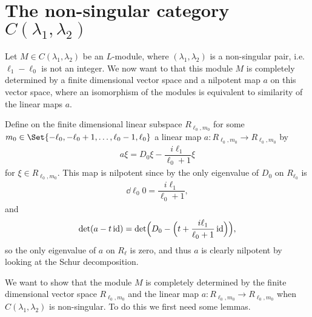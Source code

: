 \section{\texorpdfstring{The non-singular category $C(\lambda_1,\lambda_2)$}{The non-singular category C(lambda\_1,lambda\_2)}}

Let $M\in C(\lambda_1,\lambda_2)$ be an $L$-module, where $(\lambda_1,\lambda_2)$ is a non-singular pair, i.e.\ $\ell_1-\ell_0$ is not an integer. We now want to that this module $M$ is completely determined by a finite dimensional vector space and a nilpotent map $a$ on this vector space, where an isomorphism of the modules is equivalent to similarity of the linear maps $a$.

Define on the finite dimensional linear subspace $R_{\ell_0,m_0}$ for some $m_0\in \Set{-\ell_0,-\ell_0+1,\dotsc,\ell_0-1,\ell_0}$ a linear map $a\colon R_{\ell_0,m_0}\to R_{\ell_0,m_0}$ by
\begin{align}\label{eq:adef}
  a\xi = D_0\xi - \dfrac{i\ell_1}{\ell_0+1}\xi
\end{align}
for $\xi\in R_{\ell_0,m_0}$. This map is nilpotent since by  the only eigenvalue of $D_0$ on $R_{\ell_0}$ is
\begin{align*}
  \dd{\ell_0}{0} = \dfrac{i\ell_1}{\ell_0+1},
\end{align*}
and
\begin{align*}
  \det(a-t\operatorname{id}) = \det\Bigl( D_0 - \Bigl(t+\dfrac{i\ell_1}{\ell_0+1}\operatorname{id} \Bigr) \Bigr),
\end{align*}
so the only eigenvalue of $a$ on $R_\ell$ is zero, and thus $a$ is clearly nilpotent by looking at the Schur decomposition.

We want to show that the module $M$ is completely determined by the finite dimensional vector space $R_{\ell_0,m_0}$ and the linear map $a\colon R_{\ell_0,m_0}\to R_{\ell_0,m_0}$ when $C(\lambda_1,\lambda_2)$ is non-singular. To do this we first need some lemmas.

